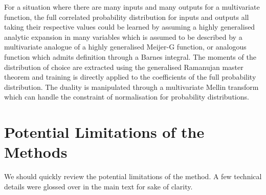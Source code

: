 \documentclass{article}
\begin{document}
For a situation where there are many inputs and many outputs for a multivariate function, the full correlated probability distribution for inputs and outputs all taking their respective values could be learned by assuming a highly generalised analytic expansion in many variables which is assumed to be described by a multivariate analogue of a highly generalised Meijer-G function, or analogous function which admits definition through a Barnes integral. The moments of the distribution of choice are extracted using the generalised Ramanujan master theorem and training is directly applied to the coefficients of the full probability distribution. The duality is manipulated through a multivariate Mellin transform which can handle the constraint of normalisation for probability distributions.


\section{Potential Limitations of the Methods}
We should quickly review the potential limitations of the method. A few technical details were glossed over in the main text for sake of clarity.
\end{document}
